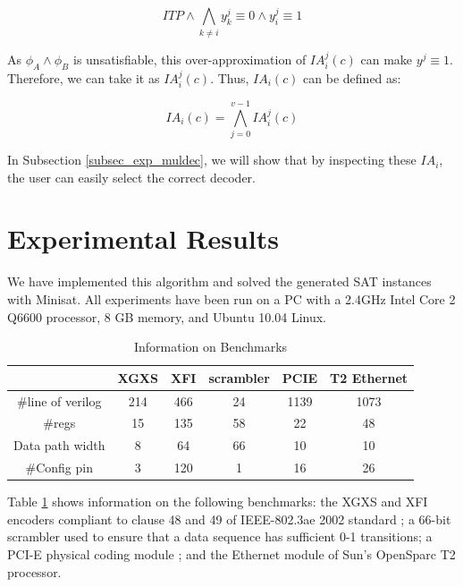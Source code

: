 \documentclass[journal]{IEEEtran}
\begin{document}
\begin{equation}\label{equ_fdtestbitIA}
 ITP \wedge\bigwedge_{k\ne i} y^j_k\equiv 0 \wedge y^j_i\equiv 1
\end{equation}

As $\phi_A\wedge \phi_B$ is unsatisfiable,
this over-approximation of $IA^j_i(c)$ can make $y^j\equiv 1$.
Therefore,
we can take it as $IA^j_i(c)$.
Thus,
$IA_i(c)$ can be defined as:

\begin{equation}\label{equ_fd_iabit}
IA_i(c)=\bigwedge _{j=0}^{v-1} IA^j_i(c)
\end{equation}

In Subsection \ref{subsec_exp_muldec},
we will show that by inspecting these $IA_i$,
the user can easily select the correct decoder.

\section{Experimental Results}\label{sec_exp}
We have implemented this algorithm
and solved the generated SAT instances with Minisat\cite{EXTSAT}.
All experiments have been run on a PC with a 2.4GHz Intel Core 2 Q6600 processor, 8 GB memory, and Ubuntu 10.04 Linux.

\begin{table}[t]
\centering
\caption{Information on Benchmarks}
\begin{tabular}{|c|c|c|c|c|c|}
\hline
&XGXS&XFI&scrambler&PCIE&T2 Ethernet\\\hline
\#line of verilog&214&466&24&1139&1073\\\hline
\#regs&15&135&58&22&48\\\hline
Data path width&8&64&66&10&10\\\hline
\#Config pin                              &3        &120       &1         &16      &26\\\hline
\end{tabular}\label{tab_benchmark}
\end{table}




Table \ref{tab_benchmark} shows information on the following benchmarks:
the XGXS and XFI encoders compliant to clause 48 and 49 of IEEE-802.3ae 2002 standard \cite{IEEE80232002};
a 66-bit scrambler used to ensure that a data sequence has sufficient 0-1 transitions;
a PCI-E physical coding module \cite{PCIESPEC};
and the Ethernet module of Sun's OpenSparc T2 processor.
\end{document}

